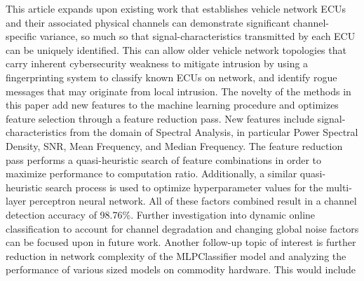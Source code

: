 \documentclass[conference]{IEEEtran}
\begin{document}
This article expands upon existing work that establishes vehicle network ECUs and their associated physical channels can demonstrate significant channel-specific variance, so much so that signal-characteristics transmitted by each ECU can be uniquely identified. This can allow older vehicle network topologies that carry inherent cybersecurity weakness to mitigate intrusion by using a fingerprinting system to classify known ECUs on network, and identify rogue messages that may originate from local intrusion. The novelty of the methods in this paper add new features to the machine learning procedure and optimizes feature selection through a feature reduction pass. New features include signal-characteristics from the domain of Spectral Analysis, in particular Power Spectral Density, SNR, Mean Frequency, and Median Frequency. The feature reduction pass performs a quasi-heuristic search of feature combinations in order to maximize performance to computation ratio. Additionally, a similar quasi-heuristic search process is used to optimize hyperparameter values for the multi-layer perceptron neural network. All of these factors combined result in a channel detection accuracy of 98.76\%. Further investigation into dynamic online classification to account for channel degradation and changing global noise factors can be focused upon in future work. Another follow-up topic of interest is further reduction in network complexity of the MLPClassifier model and analyzing the performance of various sized models on commodity hardware. This would include

\newpage
\pagebreak



\end{document}

